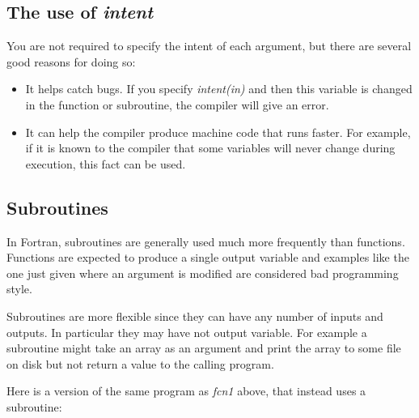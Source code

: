 \documentclass[letterpaper,10pt,english]{sphinxmanual}
\begin{document}
\subsection{The use of \emph{intent}}
\label{fortran_sub:the-use-of-intent}
You are not required to specify the intent of each argument, but there are
several good reasons for doing so:
\begin{itemize}
\item {} 
It helps catch bugs.  If you specify \emph{intent(in)} and then this variable
is changed in the function or subroutine, the compiler will give an
error.

\item {} 
It can help the compiler produce machine code that runs faster.  For
example, if it
is known to the compiler that some variables will never change during
execution, this fact can be used.

\end{itemize}


\subsection{Subroutines}
\label{fortran_sub:subroutines}
In Fortran, subroutines are generally used much more frequently than
functions.  Functions are expected to produce a single output variable and
examples like the one just given where an argument is modified are considered
bad programming style.

Subroutines are more flexible since they can have any number of inputs and
outputs.  In particular they may have not output variable.  For example a
subroutine might take an array as an argument and print the array to some
file on disk but not return a value to the calling program.

Here is a version of the same program  as \emph{fcn1} above,
that instead uses a subroutine:
\end{document}
